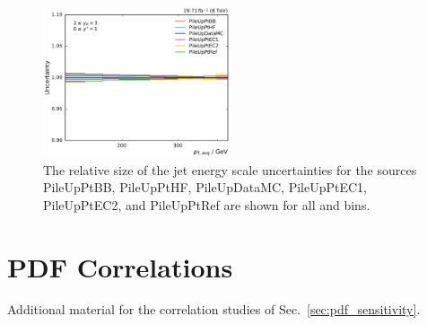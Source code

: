 \begin{figure}[htbp]
    \includegraphics[width=0.49\textwidth]{figures/measurement/jec_relunc_5_yb2ys0.pdf}
    \caption[Split-up of JEC sources: Part VI]{The relative size of the jet energy scale
             uncertainties for the sources PileUpPtBB, PileUpPtHF, PileUpDataMC,
             PileUpPtEC1, PileUpPtEC2, and PileUpPtRef are shown for all \ystar and \yboost bins.}
    \label{fig:jec_relunc_5}
\end{figure}


\section{PDF Correlations}

Additional material for the correlation studies of
Sec.~\ref{sec:pdf_sensitivity}.

